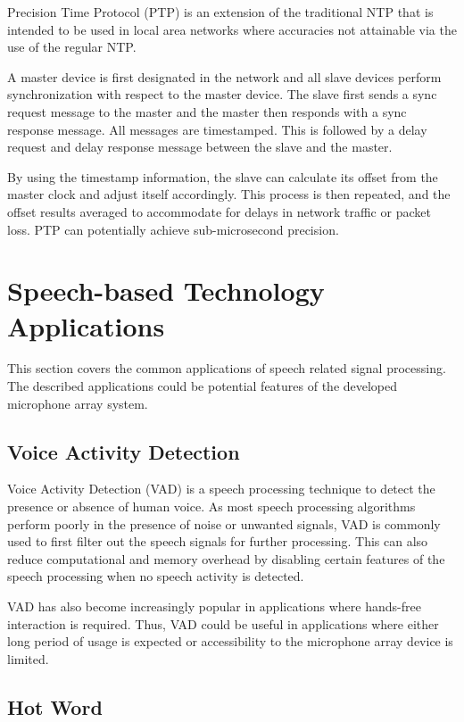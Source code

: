 \documentclass[hidelinks,12pt]{report} %
\begin{document}
Precision Time Protocol (PTP) is an extension of the traditional NTP that is intended to be used in local area networks where accuracies not attainable via the use of the regular NTP. 

A master device is first designated in the network and all slave devices perform synchronization with respect to the master device. The slave first sends a sync request message to the master and the master then responds with a sync response message. All messages are timestamped. This is followed by a delay request and delay response message between the slave and the master. 

By using the timestamp information, the slave can calculate its offset from the master clock and adjust itself accordingly. This process is then repeated, and the offset results averaged to accommodate for delays in network traffic or packet loss. PTP can potentially achieve sub-microsecond precision\cite{15}.

\section{Speech-based Technology Applications}

This section covers the common applications of speech related signal processing. The described applications could be potential features of the developed microphone array system.

\subsection{Voice Activity Detection}

Voice Activity Detection (VAD) is a speech processing technique to detect the presence or absence of human voice. As most speech processing algorithms perform poorly in the presence of noise or unwanted signals, VAD is commonly used to first filter out the speech signals for further processing. This can also reduce computational and memory overhead by disabling certain features of the speech processing when no speech activity is detected\cite{16}.

VAD has also become increasingly popular in applications where hands-free interaction is required\cite{17}. Thus, VAD could be useful in applications where either long period of usage is expected or accessibility to the microphone array device is limited.

\subsection{Hot Word}
\end{document}

